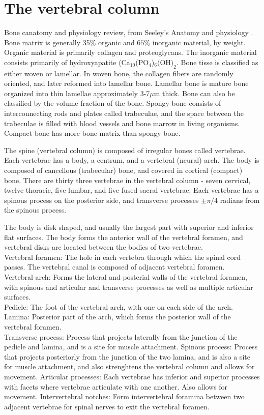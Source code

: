 \documentclass[11pt,titlepage]{article} %
\begin{document}
\section{The vertebral column}

Bone canatomy and physiology review, from Seeley's Anatomy and physiology \cite{vanputte2016seeley}.
Bone matrix is generally 35$\%$ organic and $65\%$ inorganic material, by weight. Organic material is primarily collagen and proteoglycans. The inorganic material consists primarily of hydroxyapatite (Ca$_{10}$(PO$_4$)$_6($OH$)_2$. 
Bone tisse is classified as either woven or lamellar. In woven bone, the collagen fibers are randomly oriented, and later reformed into lamellar bone. Lamellar bone is mature bone organized into thin lamellae approximately 3-7$\mu$m thick. Bone can also be classified by the volume fraction of the bone. Spongy bone consists of interconnecting rods and plates called trabeculae, and the space between the trabeculae is filled with blood vessels and bone marrow in living organisms. Compact bone has more bone matrix than spongy bone. 
 

The spine (vertebral column) is composed of irregular bones called vertebrae. Each vertebrae has a body, a centrum, and a vertebral (neural) arch. The body is composed of cancellous (trabecular) bone, and covered in cortical (compact) bone. There are thirty three vertebrae in the vertebral column - seven cervical, twelve thoracic, five lumbar, and five fused sacral vertebrae. Each vertebrae has a spinous process on the posterior side, and transverse processes $\pm \pi/4$ radians from the spinous process.  

The body is disk shaped, and usually the largest part with superior and inferior flat surfaces. The body forms the anterior wall of the vertebral foramen, and vertebral disks are located between the bodies of two vertebrae.\\
Vertebral foramen: The hole in each vertebra through which the spinal cord passes. The vertebral canal is composed of adjacent vertebral foramen.\\
Vertebral arch: Forms the lateral and posterial walls of the vertebral foramen, with spinous and articular and transverse processes as well as multiple articular surfaces.\\
Pedicle: The foot of the vertebral arch, with one on each side of the arch. \\
Lamina: Posterior part of the arch, which forms the posterior wall of the vertebral foramen.\\
Transverse process: Process that projects laterally from the junction of the pedicle and lamina, and is a site for muscle attachment.
Spinous process: Process that projects posteriorly from the junction of the two lamina, and is also a site for muscle attachment, and also strenghtens the vertebral column and allows for movement.
Articular processes: Each vertebrae has inferior and superior processes with facets where vertebrae articulate with one another. Also allows for movement.
Intervertebral notches: Form intervertebral foramina between two adjacent vertebrae for spinal nerves to exit the vertebral foramen.
\end{document}
